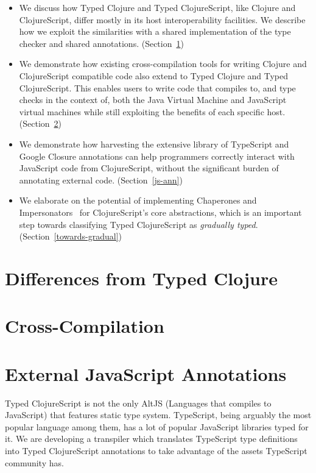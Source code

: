 \documentclass[preprint]{sigplanconf}
\begin{document}
\begin{itemize}
  \item We discuss how Typed Clojure and Typed ClojureScript,
        like Clojure and ClojureScript, differ mostly in its host interoperability facilities.
        We describe how we exploit the similarities with a shared implementation of the
        type checker and shared annotations. (Section~\ref{differences-tc})
  \item We demonstrate how existing cross-compilation tools for writing Clojure and
        ClojureScript compatible code also extend to Typed Clojure and Typed ClojureScript.
        This enables users to write code that compiles to, and type checks in the context of,
        both the Java Virtual Machine and JavaScript virtual machines while still exploiting
        the benefits of each specific host. (Section~\ref{cross-compile})
  \item We demonstrate how harvesting the extensive library of TypeScript
        and Google Closure annotations
        can help programmers correctly interact with JavaScript code from ClojureScript,
        without the significant burden of annotating external code. (Section~\ref{js-ann})
  \item We elaborate on the potential of implementing Chaperones and Impersonators~\cite{strickland2012chaperones}
        for ClojureScript's core abstractions, which is an important step towards
        classifying Typed ClojureScript as \emph{gradually typed}. (Section~\ref{towards-gradual})
\end{itemize}

\section{Differences from Typed Clojure}
\label{differences-tc}

\section{Cross-Compilation}
\label{cross-compile}

\section{External JavaScript Annotations}
 Typed ClojureScript is not the only AltJS (Languages that compiles to JavaScript) that features static type system.  TypeScript, being arguably the most popular language among them, has a lot of popular JavaScript libraries typed for it.  We are developing a transpiler which translates TypeScript type definitions into Typed ClojureScript annotations to take advantage of the assets TypeScript community has.
\end{document}

